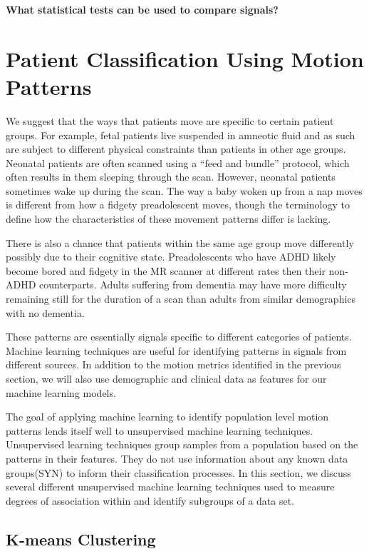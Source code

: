 \textbf{What statistical tests can be used to compare signals?}

\section{Patient Classification Using Motion Patterns} 

We suggest that the ways that patients move are specific to certain patient groups. For example, fetal patients live suspended in amneotic fluid and as such are subject to different physical constraints than patients in other age groups. Neonatal patients are often scanned using a ``feed and bundle'' protocol, which often results in them sleeping through the scan. However, neonatal patients sometimes wake up during the scan. The way a baby woken up from a nap moves is different from how a fidgety preadolescent moves, though the terminology to define how the characteristics of these movement patterns differ is lacking. 

There is also a chance that patients within the same age group move differently possibly due to their cognitive state. Preadolescents who have ADHD likely become bored and fidgety in the MR scanner at different rates then their non-ADHD counterparts. Adults suffering from dementia may have more difficulty remaining still for the duration of a scan than adults from similar demographics with no dementia.

These patterns are essentially signals specific to different categories of patients. Machine learning techniques are useful for identifying patterns in signals from different sources. In addition to the motion metrics identified in the previous section, we will also use demographic and clinical data as features for our machine learning models. 

The goal of applying machine learning to identify population level motion patterns lends itself well to unsupervised machine learning techniques. Unsupervised learning techniques group samples from a population based on the patterns in their features. They do not use information about any known data groups(SYN) to inform their classification processes. In this section, we discuss several different unsupervised machine learning techniques used to measure degrees of association within and identify subgroups of a data set.

\subsection{K-means Clustering}

